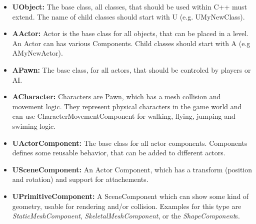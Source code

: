 \documentclass[10pt]{article}
\begin{document}
\begin{multicols*}{5}
	\begin{itemize}
		\item \textbf{UObject:} The base class, all classes, that should be used within C++ must extend. The name of child classes should start with U (e.g. UMyNewClass).
		\item \textbf{AActor:} Actor is the base class for all objects, that can be placed in a level. An Actor can has various Components. Child classes should start with A (e.g AMyNewActor).
		\item \textbf{APawn:} The base class, for all actors, that should be controled by players or AI.
		\item \textbf{ACharacter:} Characters are Pawn, which has a mesh collision and movement logic. They represent physical characters in the game world and can use CharacterMovementComponent for walking, flying, jumping and swiming logic.
		\item \textbf{UActorComponent:} The base class for all actor components. Components defines some reusable behavior, that can be added to different actors.
		\item \textbf{USceneComponent:} An Actor Component, which has a transform (position and rotation) and support for attachements.
		\item \textbf{UPrimitiveComponent:} A SceneComponent which can show some kind of geometry, usable for rendering and/or collision. Examples for this type are \emph{StaticMeshComponent}, \emph{SkeletalMeshComponent}, or the \emph{ShapeComponent}s.
		
	\end{itemize}
	

\end{multicols*}
\end{document}
